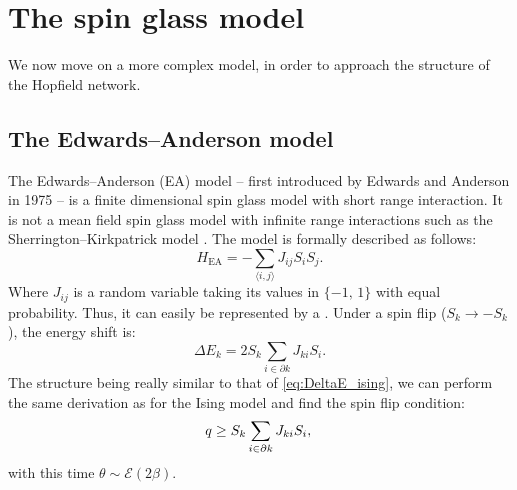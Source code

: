 \section{The spin glass model}
We now move on a more complex model, in order to approach the structure of the Hopfield network.
\subsection{The Edwards–Anderson model}
The Edwards–Anderson (EA) model -- first introduced by Edwards and Anderson in 1975 \cite{SFEdwards_1975} -- is a finite dimensional spin glass model with short range interaction. It is not a mean field spin glass model with infinite range interactions such as the Sherrington–Kirkpatrick model \cite{SK_model}. The model is formally described as follows:
\begin{equation}
  H_\text{EA}=-\sum_{\langle i,j \rangle}J_{ij}S_iS_j.
  \label{eq:EA_model}
\end{equation}
Where $J_{ij}$ is a random variable taking its values in $\{-1,\,1\}$ with equal probability. Thus, it can easily be represented by a \Bits.
Under a spin flip ($S_k \to - S_k$), the energy shift is:
\begin{equation}
  \Delta E_k=2 S_k \sum_{i \in \partial k}J_{ki}S_i.
  \label{eq:DeltaE_EA}
\end{equation}
The structure being really similar to that of \eqref{eq:DeltaE_ising}, we can perform the same derivation as for the Ising model and find the spin flip condition:
\begin{equation}
 q\geq S_k  \sum_{i \in \partial k}J_{ki}S_i,\\
  \label{eq:flip_EA_int}
\end{equation}
with this time $\theta \sim \mathcal{E}(2\beta)$.
